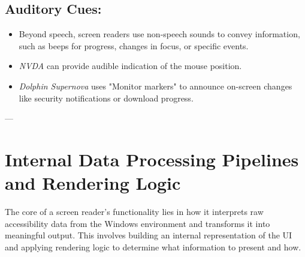 \subsection*{Auditory Cues:}
\begin{itemize}
    \item Beyond speech, screen readers use non-speech sounds to convey information, such as beeps for progress, changes in focus, or specific events.
    \item \emph{NVDA} can provide audible indication of the mouse position.\cite{NVDASpeech}
    \item \emph{Dolphin Supernova} uses "Monitor markers" to announce on-screen changes like security notifications or download progress.\cite{SuperNovaFeatures}
\end{itemize}

---

\section{Internal Data Processing Pipelines and Rendering Logic}
\label{sec:data-pipelines}

The core of a screen reader's functionality lies in how it interprets raw accessibility data from the Windows environment and transforms it into meaningful output. This involves building an internal representation of the UI and applying rendering logic to determine what information to present and how.

